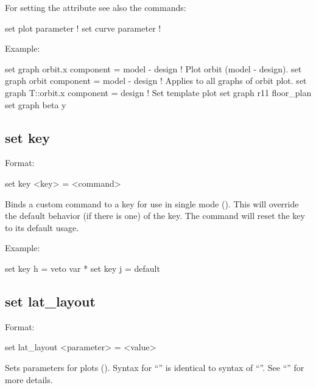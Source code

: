 {{For setting the  attribute see also the commands:
\begin{example}
  set plot parameter      ! 
  set curve parameter     ! 
\end{example}

Example:
\begin{example}
  set graph orbit.x component = model - design  ! Plot orbit (model - design).
  set graph orbit component = model - design    ! Applies to all graphs of orbit plot.
  set graph T::orbit.x component = design       ! Set template plot
  set graph r11 floor_plan%
  set graph beta y%
\end{example}


\subsection{set key}
\label{s:set.key}

Format:
\begin{example}
  set key <key> = <command>
\end{example}

Binds a custom command to a key for use in single mode ().  This will override the
default behavior (if there is one) of the key.  The command  will reset the key to its
default usage.

Example:
\begin{example}
  set key h = veto var *
  set key j = default
\end{example}



\subsection{set lat_layout}
\label{s:set.lat.layout}

Format:
\begin{example}
  set lat_layout <parameter> = <value>
\end{example}

Sets parameters for  plots ().  Syntax for ``'' is
identical to syntax of ``''.  See ``'' for more details.

}}
